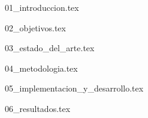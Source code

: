 \documentclass[hidelinks, headlogo, framedcover]{tfeEPCC}
\begin{document}


\setlength{\headheight}{26pt}
\addtolength{\topmargin}{-12pt}
\pagestyle{fancy}
\setcounter{page}{1}

{01_introduccion.tex}

{02_objetivos.tex}
\newpage
\null%
\thispagestyle{empty}
\newpage

{03_estado_del_arte.tex}

{04_metodologia.tex}
\newpage
\null%
\thispagestyle{empty}
\newpage

{05_implementacion_y_desarrollo.tex}

{06_resultados.tex}
\end{document}
